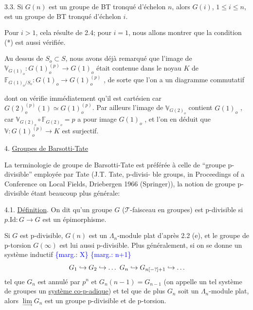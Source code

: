 \documentclass[11pt]{article}
\newcommand{\scanpage}[1]{\par\bigskip\noindent{\small\sffamily[scan #1]}\par}
\newcommand{\mspage}[1]{{\small\sffamily[p.\,#1]}}
\newcommand{\hand}[1]{\textcolor{blue}{#1}}
\let\over\relax
\newcommand{\over}[2]{\textcolor{gray}{#1}\textcolor{blue}{\ensuremath{^{\!\nearrow}}#2}}
\newcommand{\margin}[1]{\textcolor{blue}{\{\textsf{marg.:} #1\}}}
\newcommand{\uline}[1]{\underline{#1}}
\newcommand{\unsure}[1]{[#1?]}
\newenvironment{diagramblock}{\par\begin{center}}{\end{center}\par}
\begin{document}
3.3. Si $G(n)$ est un groupe de BT tronqué d'échelon $n$, alors
$G(i)$, $1 \leq i \leq n$, est un groupe de BT tronqué d'échelon $i$.

Pour $i > 1$, cela résulte de 2.4; pour $i = 1$, nous allons
montrer que la condition (*) est aussi vérifiée.

Au dessus de $S_{o} \subset S$, nous avons déjà remarqué que l'image de
$\mathbb{V}_{G(1)_{o}} : G(1)_{o}^{(p)} \rightarrow G(1)_{o}$ était contenue dans le noyau $K$ de
$\mathbb{F}_{G(1)_{o}/S_{o}} : G(1)_{o} \rightarrow G(1)_{o}^{(p)}$ , de sorte que l'on a un diagramme commutatif
\begin{diagramblock}
\end{diagramblock}
dont on vérifie immédiatement qu'il est cartésien car $G(2)_{o}^{(p)}(1) \simeq G(1)_{o}^{(p)}$.
Par ailleurs l'image de $\mathbb{V}_{G(2)_{o}}$ contient $G(1)_{o}$ , car
$\mathbb{V}_{G(2)_{o}} \circ \mathbb{F}_{G(2)_{o}} = p$ a pour image $G(1)_{o}$ , et l'on en déduit que
$\mathbb{V} : G(1)_{o}^{(p)} \rightarrow K$ est surjectif.

\mspage{61}

\clearpage
\scanpage{129/62}
\mspage{\hand{III-7}}

4. \uline{Groupes de Barsotti-Tate}

La terminologie de groupe de Barsotti-Tate est préférée à
celle de ``groupe p-divisible'' employée par Tate (J.T. Tate, p-divisi-%
ble groups, in Proceedings of a Conference on Local Fields, Driebergen
1966 (Springer)), la notion de groupe p-divisible étant beaucoup plus
générale:

4.1. \uline{Définition}. On dit qu'un groupe $G$ ($\mathcal{T}$-faisceau en groupes)
est p-divisible si $p.\mathrm{Id}\colon G \to G$ est un épimorphisme.

Si $G$ est p-divisible, $G(n)$ est un $\Lambda_n$-module plat d'après
2.2 (e), et le groupe de p-torsion $G(\infty)$ est lui aussi p-divisible.
Plus généralement, si on se donne un système inductif
\margin{X} \margin{n+1}
\[ G_1 \hookrightarrow G_2 \hookrightarrow \ldots\ G_n \hookrightarrow G_{n\over{\unsure{-}}{+}1} \hookrightarrow \ldots \]
tel que $G_n$ est annulé par $p^n$ et $G_n(n-1) = G_{n-1}$ (on appelle un tel
système de groupes un \uline{système co-p-adique}) et tel que de plus $G_n$ soit
un $\Lambda_n$-module plat, alors $\lim\limits_{\rightarrow} G_n$ est un groupe p-divisible et de p-torsion.
\end{document}
